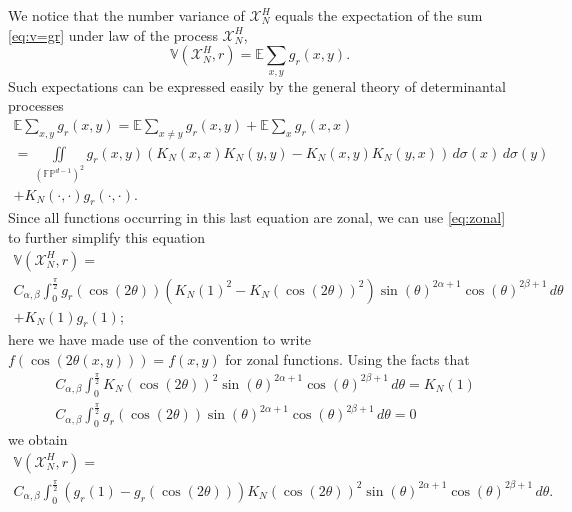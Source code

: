 We notice that the number variance of $\mathscr{X}_N^H$ equals the expectation
of the sum \eqref{eq:v=gr} under law of the process $\mathscr{X}_N^H$,
\begin{equation}
  \label{eq:var-harmonic}
  \mathbb{V}(\mathscr{X}_N^H,r)=\mathbb{E}\sum_{x,y}g_r(x,y).
\end{equation}
Such expectations can be expressed easily by the general theory of
determinantal processes
\begin{multline*}
  \mathbb{E}\sum_{x,y}g_r(x,y)=\mathbb{E}\sum_{x\neq y}g_r(x,y)+
  \mathbb{E}\sum_{x}g_r(x,x)\\
  =\iint\limits_{(\mathbb{FP}^{d-1})^2}
  g_r(x,y)\left(K_N(x,x)K_N(y,y)-K_N(x,y)K_N(y,x)\right)\,d\sigma(x)\,d\sigma(y)
  \\+K_N(\cdot,\cdot)g_r(\cdot,\cdot).
\end{multline*}
Since all functions occurring in this last equation are zonal, we can use
\eqref{eq:zonal} to further simplify this equation
\begin{multline*}
  \mathbb{V}(\mathscr{X}_N^H,r)=\\C_{\alpha,\beta}
  \int_0^{\frac\pi2}g_r(\cos(2\theta))
  \left(K_N(1)^2-K_N(\cos(2\theta))^2\right)
  \sin(\theta)^{2\alpha+1}\cos(\theta)^{2\beta+1}\,d\theta\\+K_N(1)g_r(1);
\end{multline*}
here we have made use of the convention to write $f(\cos(2\theta(x,y)))=f(x,y)$
for zonal functions.
Using the facts that
\begin{align*}
  &C_{\alpha,\beta}\int_0^{\frac\pi2}K_N(\cos(2\theta))^2
  \sin(\theta)^{2\alpha+1}\cos(\theta)^{2\beta+1}\,d\theta=K_N(1)\\
  &C_{\alpha,\beta}\int_0^{\frac\pi2}g_r(\cos(2\theta))
  \sin(\theta)^{2\alpha+1}\cos(\theta)^{2\beta+1}\,d\theta=0
\end{align*}
we obtain
\begin{multline*}
  \mathbb{V}(\mathscr{X}_N^H,r)=\\C_{\alpha,\beta}\int_0^{\frac\pi2}
  \left(g_r(1)-g_r(\cos(2\theta))\right)K_N(\cos(2\theta))^2
  \sin(\theta)^{2\alpha+1}\cos(\theta)^{2\beta+1}\,d\theta.
\end{multline*}

